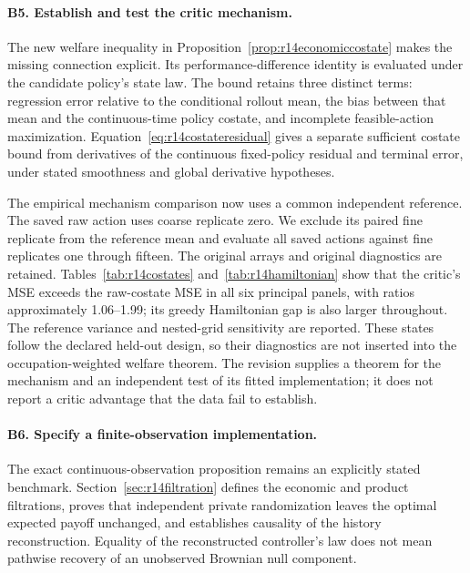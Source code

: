 \paragraph*{B5. Establish and test the critic mechanism.}
The new welfare inequality in Proposition~\ref{prop:r14economiccostate} makes the missing connection explicit. Its performance-difference identity is evaluated under the candidate policy's state law. The bound retains three distinct terms: regression error relative to the conditional rollout mean, the bias between that mean and the continuous-time policy costate, and incomplete feasible-action maximization. Equation~\ref{eq:r14costateresidual} gives a separate sufficient costate bound from derivatives of the continuous fixed-policy residual and terminal error, under stated smoothness and global derivative hypotheses.

The empirical mechanism comparison now uses a common independent reference. The saved raw action uses coarse replicate zero. We exclude its paired fine replicate from the reference mean and evaluate all saved actions against fine replicates one through fifteen. The original arrays and original diagnostics are retained. Tables~\ref{tab:r14costates} and~\ref{tab:r14hamiltonian} show that the critic's MSE exceeds the raw-costate MSE in all six principal panels, with ratios approximately 1.06--1.99; its greedy Hamiltonian gap is also larger throughout. The reference variance and nested-grid sensitivity are reported. These states follow the declared held-out design, so their diagnostics are not inserted into the occupation-weighted welfare theorem. The revision supplies a theorem for the mechanism and an independent test of its fitted implementation; it does not report a critic advantage that the data fail to establish.

\paragraph*{B6. Specify a finite-observation implementation.}
The exact continuous-observation proposition remains an explicitly stated benchmark. Section~\ref{sec:r14filtration} defines the economic and product filtrations, proves that independent private randomization leaves the optimal expected payoff unchanged, and establishes causality of the history reconstruction. Equality of the reconstructed controller's law does not mean pathwise recovery of an unobserved Brownian null component.

